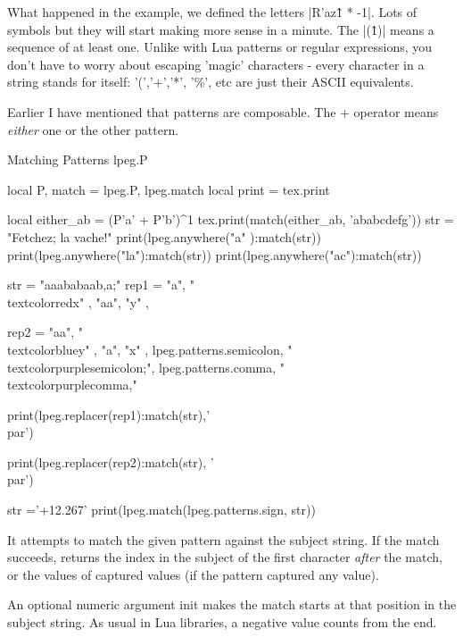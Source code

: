 What happened in the example, we defined the letters |R'az\^1 * -1|. Lots of symbols but they will start making more sense in a minute. The  |(\^1)| means a sequence of at least one. Unlike with Lua patterns or regular expressions, you don't have to worry about escaping 'magic' characters - every character in a string stands for itself: '(','+','*', '\%', etc are just their ASCII equivalents. 

Earlier I have mentioned that patterns are composable. The + operator means \emph{either} one or the other pattern.

\begin{texexample}{Matching Patterns lpeg.P}{}
\begin{luacode}
local P, match = lpeg.P, lpeg.match
local print = tex.print
       
local either_ab = (P'a' + P'b')^1
        tex.print(match(either_ab,  'ababcdefg'))
     str = "Fetchez; la vache!"
print(lpeg.anywhere("a" ):match(str))
print(lpeg.anywhere("la"):match(str))
print(lpeg.anywhere("ac"):match(str))  



 str = "aaababaab,a;"
rep1 = {
    { "a",  "\\textcolor{red}{x}" },
    { "aa", "y" },
}

rep2 = {
    { "aa", "\\textcolor{blue}{y}" },
    { "a",  "x" },
    {lpeg.patterns.semicolon, "\\textcolor{purple}{semicolon;}"},
    {lpeg.patterns.comma, "\\textcolor{purple}{comma,}"}
}

print(lpeg.replacer(rep1):match(str),'\\par')

print(lpeg.replacer(rep2):match(str), '\\par') 

str ='+12.267'
print(lpeg.match(lpeg.patterns.sign, str))
\end{luacode}
\end{texexample}

It attempts to match the given pattern against the subject string. If the match succeeds, returns the index in the subject of the first character \emph{after} the match, or the values of captured values (if the pattern captured any value).

An optional numeric argument init makes the match starts at that position in the subject string. As usual in Lua libraries, a negative value counts from the end.

